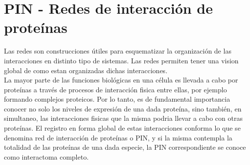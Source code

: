 \section{PIN - Redes de interacción de proteínas}
\label{sec:redes}
Las redes son construcciones útiles para esquematizar la organización de las interacciones en distinto tipo de sistemas. Las redes permiten tener una vision global de como estan organizadas dichas interacciones.\\
La mayor parte de las funciones biológicas en una célula es llevada a cabo por proteínas a través de procesos de interacción fisica entre ellas, por ejemplo formando complejos proteicos. Por lo tanto, es de fundamental importancia conocer no solo los niveles de expresión de una dada proteína, sino también, en simultaneo, las interacciones fisicas que la misma podria llevar a cabo con otras proteínas. El registro en forma global de estas interacciones conforma lo que se denomina red de interacción de proteínas o PIN, y si la misma contempla la totalidad de las proteínas de una dada especie, la PIN correspondiente se conoce como interactoma completo.\\
